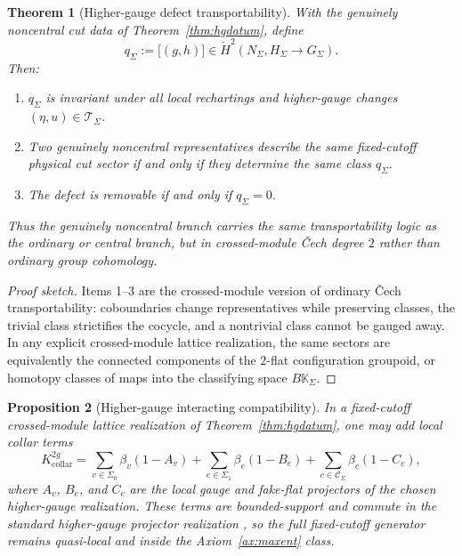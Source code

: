 \documentclass[11pt]{article}
\newtheorem{theorem}{Theorem}[section]
\newtheorem{proposition}[theorem]{Proposition}
\begin{document}
\begin{theorem}[Higher-gauge defect transportability]\label{thm:hgtransport}
With the genuinely noncentral cut data of Theorem~\ref{thm:hgdatum}, define
\[
q_\Sigma:=\bigl[(g,h)\bigr]\in \check H^2(N_\Sigma,H_\Sigma\to G_\Sigma).
\]
Then:
\begin{enumerate}[leftmargin=2em]
\item \(q_\Sigma\) is invariant under all local rechartings and higher-gauge changes \((\eta,u)\in \mathcal T_\Sigma\).
\item Two genuinely noncentral representatives describe the same fixed-cutoff physical cut sector if and only if they determine the same class \(q_\Sigma\).
\item The defect is removable if and only if \(q_\Sigma=0\).
\end{enumerate}
Thus the genuinely noncentral branch carries the same transportability logic as the ordinary or central branch, but in crossed-module \v{C}ech degree \(2\) rather than ordinary group cohomology.
\end{theorem}

\begin{proof}[Proof sketch]
Items 1--3 are the crossed-module version of ordinary \v{C}ech transportability: coboundaries
change representatives while preserving classes, the trivial class strictifies the cocycle, and a
nontrivial class cannot be gauged away. In any explicit crossed-module lattice realization, the
same sectors are equivalently the connected components of the \(2\)-flat configuration groupoid,
or homotopy classes of maps into the classifying space \(B\mathbb K_\Sigma\).
\end{proof}

\begin{proposition}[Higher-gauge interacting compatibility]\label{prop:hginteracting}
In a fixed-cutoff crossed-module lattice realization of Theorem~\ref{thm:hgdatum}, one may add local collar terms
\[
K_{\mathrm{collar}}^{2g}
=
\sum_{v\in\Sigma_0}\beta_v(1-A_v)
+
\sum_{e\in\Sigma_1}\beta_e(1-B_e)
+
\sum_{c\in\mathcal C_\Sigma}\beta_c(1-C_c),
\]
where \(A_v\), \(B_e\), and \(C_c\) are the local gauge and fake-flat projectors of the chosen higher-gauge realization. These terms are bounded-support and commute in the standard higher-gauge projector realization \cite{bullivant17}, so the full fixed-cutoff generator remains quasi-local and inside the Axiom~\ref{ax:maxent} class.
\end{proposition}
\end{document}
